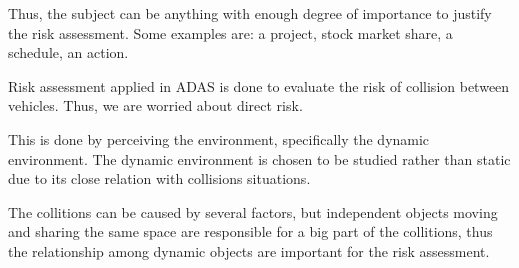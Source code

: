 Thus, the subject can be anything with enough degree of importance to justify the risk assessment. Some examples are: a project, stock market share, a schedule, an action.

Risk assessment applied in ADAS is done to evaluate the risk of collision between vehicles. Thus, we are worried about direct risk. 

This is done by perceiving the environment, specifically the dynamic environment. The dynamic environment is chosen to be studied rather than static due to its close relation with  collisions situations. 

The collitions can be caused by several factors, but independent objects moving and sharing the same space are responsible for a big part of the collitions, thus the relationship among dynamic objects are important for the risk assessment.
